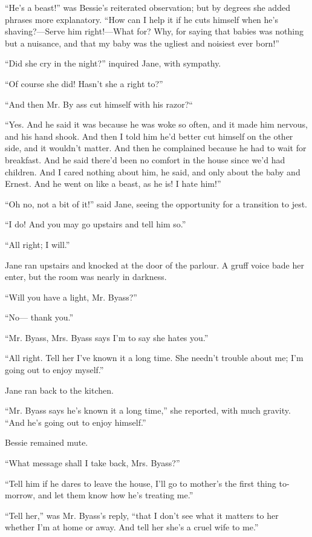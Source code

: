 ``He's a beast!'' was Bessie's reiterated observation; but by degrees
she added phrases more explanatory. ``How can I help it if he cuts
himself when he's shaving?---Serve him right!---What for? Why, for
saying that babies was nothing but a nuisance, and that my baby was the
ugliest and noisiest ever born!''

``Did she cry in the night?'' inquired Jane, with sympathy.

``Of course she did! Hasn't she a right to?''

``And then Mr. By ass cut himself with his razor?``

``Yes. And he said it was because he was woke so often, and it made him
nervous, and his hand shook. And then I told him he'd better cut himself
on the other side, and it wouldn't matter. And then he complained
because he had to wait for breakfast. And
{\protect\hypertarget{37}{}{}}he said there'd been no comfort in the
house since we'd had children. And I cared nothing about him, he said,
and only about the baby and Ernest. And he went on like a beast, as he
is! I hate him!''

``Oh no, not a bit of it!'' said Jane, seeing the opportunity for a
transition to jest.

``I do! And you may go upstairs and tell him so.''

``All right; I will.''

Jane ran upstairs and knocked at the door of the parlour. A gruff voice
bade her enter, but the room was nearly in darkness.

``Will you have a light, Mr. Byass?''

``No--- thank you.''

``Mr. Byass, Mrs. Byass says I'm to say she hates you.''

``All right. Tell her I've known it a long time. She needn't trouble
about me; I'm going out to enjoy myself.''

Jane ran back to the kitchen.

``Mr. Byass says he's known it a long time,'' she reported, with much
gravity. ``And he's going out to enjoy himself.''

{\protect\hypertarget{38}{}{}}Bessie remained mute.

``What message shall I take back, Mrs. Byass?''

``Tell him if he dares to leave the house, I'll go to mother's the first
thing to-morrow, and let them know how he's treating me.''

``Tell her,'' was Mr. Byass's reply, ``that I don't see what it matters
to her whether I'm at home or away. And tell her she's a cruel wife to
me.''

